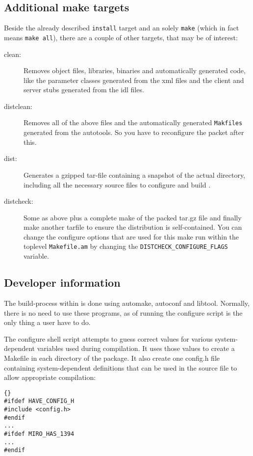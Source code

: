 \subsection{Additional make targets}

Beside the already described \texttt{install} target and an solely
\texttt{make} (which in fact means \texttt{make all}), there are a
couple of other targets, that may be of interest:

\begin{description}
\item[clean:] Removes object files, libraries, binaries and
  automatically generated code, like the parameter classes generated
  from the xml files and the client and server stubs generated from
  the idl files.
\item[distclean:] Removes all of the above files and the automatically
  generated \texttt{Makfiles} generated from the autotools. So you
  have to reconfigure the packet after this.
\item[dist:] Generates a gzipped tar-file containing a snapshot of the
  actual \miro directory, including all the necessary source files to
  configure and build \miro.
\item[distcheck:] Some as above plus a complete make of the packed
  tar.gz file and finally make another tarfile to ensure the
  distribution is self-contained. You can change the configure options
  that are used for this make run within the toplevel
  \texttt{Makefile.am} by changing the
  \texttt{DISTCHECK\_CONFIGURE\_FLAGS} variable.
\end{description}

\subsection{Developer information}

The build-process within \miro is done using automake, autoconf and
libtool. Normally, there is no need to use these programs, as of
running the configure script is the only thing a user have to do.

The configure shell script attempts to guess correct values for
various system-dependent variables used during compilation. It uses
those values to create a Makefile in each directory of the package.
It also create one config.h file containing system-dependent
definitions that can be used in the source file to allow appropriate
compilation:

\begin{lstlisting}[frame=tb]{}
#ifdef HAVE_CONFIG_H
#include <config.h>
#endif
...
#ifdef MIRO_HAS_1394
...
#endif
\end{lstlisting}

